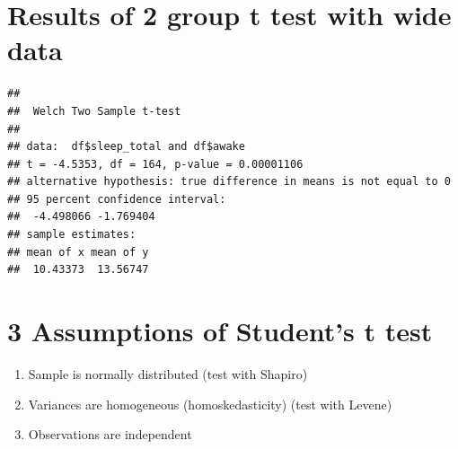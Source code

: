 \documentclass[
]{book}
\newenvironment{Shaded}{\begin{snugshade}}{\end{snugshade}}
\newcommand{\DataTypeTok}[1]{\textcolor[rgb]{0.13,0.29,0.53}{#1}}
\newcommand{\KeywordTok}[1]{\textcolor[rgb]{0.13,0.29,0.53}{\textbf{#1}}}
\newcommand{\NormalTok}[1]{#1}
\newcommand{\OperatorTok}[1]{\textcolor[rgb]{0.81,0.36,0.00}{\textbf{#1}}}
\providecommand{\tightlist}{%
  \setlength{\itemsep}{0pt}\setlength{\parskip}{0pt}}
\begin{document}
\begin{Shaded}
\end{Shaded}

\hypertarget{results-of-2-group-t-test-with-wide-data-1}{%
\section{Results of 2 group t test with wide data}\label{results-of-2-group-t-test-with-wide-data-1}}

\begin{Shaded}
\end{Shaded}

\begin{verbatim}
## 
##  Welch Two Sample t-test
## 
## data:  df$sleep_total and df$awake
## t = -4.5353, df = 164, p-value = 0.00001106
## alternative hypothesis: true difference in means is not equal to 0
## 95 percent confidence interval:
##  -4.498066 -1.769404
## sample estimates:
## mean of x mean of y 
##  10.43373  13.56747
\end{verbatim}

\hypertarget{assumptions-of-students-t-test-1}{%
\section{3 Assumptions of Student's t test}\label{assumptions-of-students-t-test-1}}

\begin{enumerate}
\def\labelenumi{\arabic{enumi}.}
\tightlist
\item
  Sample is normally distributed (test with Shapiro)
\item
  Variances are homogeneous (homoskedasticity) (test with Levene)
\item
  Observations are independent
\end{enumerate}
\end{document}
